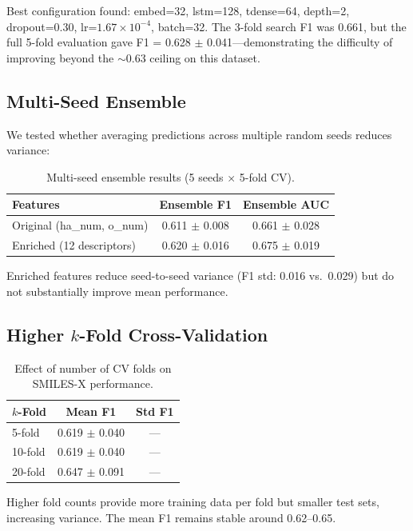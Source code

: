 \documentclass[11pt,a4paper]{article}
\begin{document}
Best configuration found: embed=32, lstm=128, tdense=64, depth=2, dropout=0.30, lr=$1.67 \times 10^{-4}$, batch=32. The 3-fold search F1 was 0.661, but the full 5-fold evaluation gave F1 = 0.628 $\pm$ 0.041---demonstrating the difficulty of improving beyond the $\sim$0.63 ceiling on this dataset.

\subsection{Multi-Seed Ensemble}

We tested whether averaging predictions across multiple random seeds reduces variance:

\begin{table}[H]
\centering
\caption{Multi-seed ensemble results (5 seeds $\times$ 5-fold CV).}
\label{tab:ensemble}
\begin{tabular}{lcc}
\toprule
Features & Ensemble F1 & Ensemble AUC \\
\midrule
Original (ha\_num, o\_num) & 0.611 $\pm$ 0.008 & 0.661 $\pm$ 0.028 \\
Enriched (12 descriptors) & 0.620 $\pm$ 0.016 & 0.675 $\pm$ 0.019 \\
\bottomrule
\end{tabular}
\end{table}

Enriched features reduce seed-to-seed variance (F1 std: 0.016 vs.\ 0.029) but do not substantially improve mean performance.

\subsection{Higher $k$-Fold Cross-Validation}

\begin{table}[H]
\centering
\caption{Effect of number of CV folds on SMILES-X performance.}
\label{tab:kfold}
\begin{tabular}{lcc}
\toprule
$k$-Fold & Mean F1 & Std F1 \\
\midrule
5-fold & 0.619 $\pm$ 0.040 & --- \\
10-fold & 0.619 $\pm$ 0.040 & --- \\
20-fold & 0.647 $\pm$ 0.091 & --- \\
\bottomrule
\end{tabular}
\end{table}

Higher fold counts provide more training data per fold but smaller test sets, increasing variance. The mean F1 remains stable around 0.62--0.65.
\end{document}
